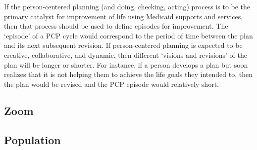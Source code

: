 \documentclass[
]{book}
\begin{document}
If the person-centered planning (and doing, checking, acting) process is to be the primary catalyst for improvement of life using Medicaid supports and services, then that process should be used to define episodes for improvement. The `episode' of a PCP cycle would correspond to the period of time between the plan and its next subsequent revision. If person-centered planning is expected to be creative, collaborative, and dynamic, then different `visions and revisions' of the plan will be longer or shorter. For instance, if a person develops a plan but soon realizes that it is not helping them to achieve the life goals they intended to, then the plan would be revised and the PCP episode would relatively short.

\hypertarget{zoom}{%
\subsection{Zoom}\label{zoom}}

\hypertarget{pop}{%
\subsection{Population}\label{pop}}

  
\end{document}
